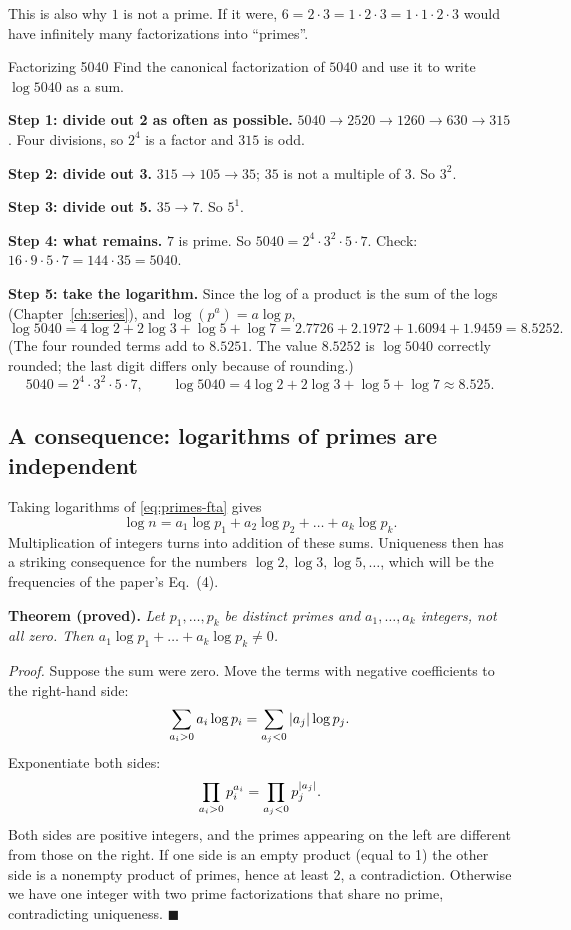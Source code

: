 This is also why $1$ is not a prime. If it were, $6=2\cdot3=1\cdot2\cdot3=1\cdot1\cdot2\cdot3$ would have infinitely many factorizations into ``primes''.

\begin{sample}{Factorizing 5040}
Find the canonical factorization of $5040$ and use it to write $\log 5040$ as a sum.

\textbf{Step 1: divide out 2 as often as possible.} $5040\to2520\to1260\to630\to315$. Four divisions, so $2^4$ is a factor and $315$ is odd.

\textbf{Step 2: divide out 3.} $315\to105\to35$; $35$ is not a multiple of 3. So $3^2$.

\textbf{Step 3: divide out 5.} $35\to7$. So $5^1$.

\textbf{Step 4: what remains.} $7$ is prime. So $5040=2^4\cdot3^2\cdot5\cdot7$. Check: $16\cdot9\cdot5\cdot7=144\cdot35=5040$.

\textbf{Step 5: take the logarithm.} Since the log of a product is the sum of the logs (Chapter~\ref{ch:series}), and $\log(p^a)=a\log p$,
\[
\log 5040 = 4\log2+2\log3+\log5+\log7 = 2.7726+2.1972+1.6094+1.9459 = 8.5252 .
\]
(The four rounded terms add to $8.5251$. The value $8.5252$ is $\log5040$ correctly rounded; the last digit differs only because of rounding.)
\[
\boxed{5040=2^4\cdot3^2\cdot5\cdot7,\qquad \log5040=4\log2+2\log3+\log5+\log7\approx 8.525.}
\]
\end{sample}

\subsection{A consequence: logarithms of primes are independent}

Taking logarithms of \cref{eq:primes-fta} gives
\begin{equation}
\log n = a_1\log p_1 + a_2\log p_2 + \dots + a_k\log p_k .
\label{eq:primes-logfta}
\end{equation}
Multiplication of integers turns into addition of these sums. Uniqueness then has a striking consequence for the numbers $\log2,\log3,\log5,\dots$, which will be the frequencies of the paper's Eq.~(4).

\textbf{Theorem (proved).} \emph{Let $p_1,\dots,p_k$ be distinct primes and $a_1,\dots,a_k$ integers, not all zero. Then $a_1\log p_1+\dots+a_k\log p_k\neq0$.}

\emph{Proof.} Suppose the sum were zero. Move the terms with negative coefficients to the right-hand side:
\[
\sum_{a_i>0} a_i\log p_i = \sum_{a_j<0} \left\lvert a_j\right\rvert\log p_j .
\]
Exponentiate both sides:
\[
\prod_{a_i>0} p_i^{a_i} = \prod_{a_j<0} p_j^{\left\lvert a_j\right\rvert} .
\]
Both sides are positive integers, and the primes appearing on the left are different from those on the right. If one side is an empty product (equal to 1) the other side is a nonempty product of primes, hence at least 2, a contradiction. Otherwise we have one integer with two prime factorizations that share no prime, contradicting uniqueness. $\blacksquare$

